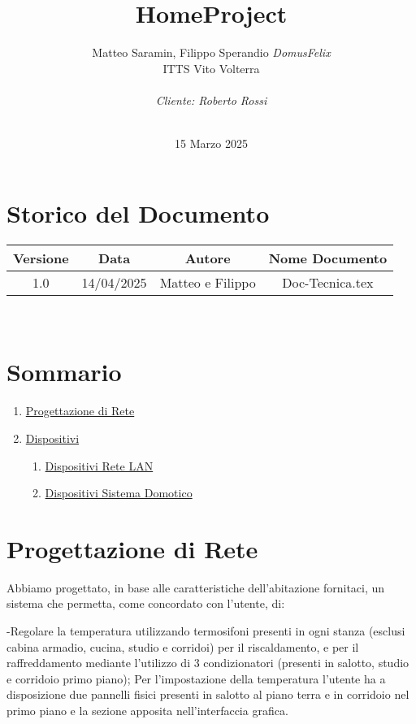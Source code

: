\documentclass[italian, 12pt, a4paper]{article}
\title{\huge{HomeProject}}
\author{Matteo Saramin, Filippo Sperandio \textit{DomusFelix} \\ {\small ITTS Vito Volterra} \\ \\ \emph{Cliente: Roberto Rossi}}
\date{\version\\ 15 Marzo 2025}
\begin{document}
\maketitle
\section{Storico del Documento}
\begin{center}
    \renewcommand{\arraystretch}{1.5} %
    \begin{tabular}{|c|c|c|c|}
        \hline
        \rowcolor{violet!30}
        Versione & Data & Autore & Nome Documento \\
        \hline
        1.0 & 14/04/2025 & Matteo e Filippo & Doc-Tecnica.tex \\
        \hline
    \end{tabular}\\[4mm]
\end{center}
\clearpage
\section{Sommario}
\begin{enumerate}
    \item \hyperref[sec:progettazione]{\Large Progettazione di Rete}
    \item \hyperref[sec:dispositivi]{\Large Dispositivi}
    \begin{enumerate}
        \item \hyperref[sec:lan]{Dispositivi Rete LAN}
        \item \hyperref[sec:domotico]{Dispositivi Sistema Domotico}
    \end{enumerate}
\end{enumerate}
\clearpage
\section{Progettazione di Rete}\label{sec:progettazione}
Abbiamo progettato, in base alle caratteristiche dell'abitazione fornitaci, un sistema  che permetta, come concordato con l’utente, di: 

-Regolare la temperatura utilizzando termosifoni presenti in ogni stanza (esclusi cabina armadio, cucina, studio e corridoi) per il riscaldamento, e per il raffreddamento mediante l’utilizzo di 3 condizionatori (presenti in salotto, studio e corridoio primo piano);
Per l'impostazione della temperatura l’utente ha a disposizione due pannelli fisici presenti in salotto al piano terra e in corridoio nel primo piano e la sezione apposita nell’interfaccia grafica.
\end{document}
